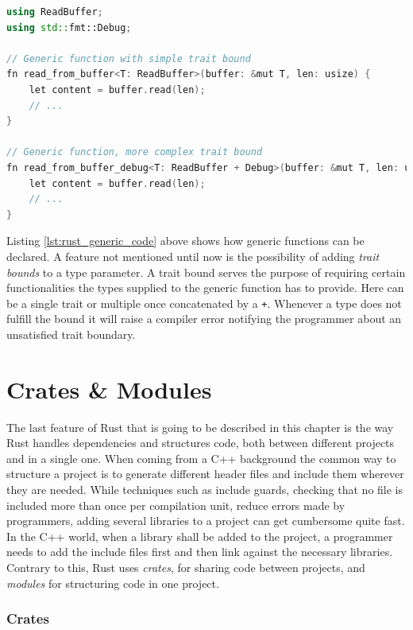 \begin{lstlisting}[caption={A generic function in Rust showcasing trait bounds}, label={lst:rust_generic_code}, language=C++]
using ReadBuffer;
using std::fmt::Debug;

// Generic function with simple trait bound
fn read_from_buffer<T: ReadBuffer>(buffer: &mut T, len: usize) {
	let content = buffer.read(len);
	// ...
}

// Generic function, more complex trait bound
fn read_from_buffer_debug<T: ReadBuffer + Debug>(buffer: &mut T, len: usize) {
	let content = buffer.read(len);
	// ...
}
\end{lstlisting}

\noindent
Listing \ref{lst:rust_generic_code} above shows how generic functions can be declared. A feature not mentioned until now is the possibility of adding \textit{trait bounds} to a type parameter. A trait bound serves the purpose of requiring certain functionalities the types supplied to the generic function has to provide. Here can be a single trait or multiple once concatenated by a \texttt{+}. Whenever a type does not fulfill the bound it will raise a compiler error notifying the programmer about an unsatisfied trait boundary.

\section{Crates \& Modules}

The last feature of Rust that is going to be described in this chapter is the way Rust handles dependencies and structures code, both between different projects and in a single one. When coming from a C++ background the common way to structure a project is to generate different header files and include them wherever they are needed. While techniques such as include guards, checking that no file is included more than once per compilation unit, reduce errors made by programmers, adding several libraries to a project can get cumbersome quite fast. In the C++ world, when a library shall be added to the project, a programmer needs to add the include files first and then link against the necessary libraries. Contrary to this, Rust uses \textit{crates}, for sharing code between projects, and \textit{modules} for structuring code in one project. 

\subsubsection{Crates}


